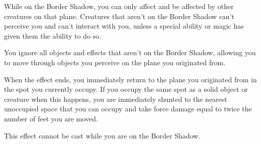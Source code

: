 While on the  Border Shadow, you can only affect and be affected by other creatures on that plane. Creatures that aren’t on the Border Shadow can’t perceive you and can’t interact with you, unless a special ability or magic has given them the ability to do so.

You ignore all objects and effects that aren’t on the Border Shadow, allowing you to move through objects you perceive on the plane you originated from.

When the effect ends, you immediately return to the plane you originated from in the spot you currently occupy. If you occupy the same spot as a solid object or creature when this happens, you are immediately shunted to the nearest unoccupied space that you can occupy and take force damage equal to twice the number of feet you are moved.

This effect cannot be cast while you are on the Border Shadow.










